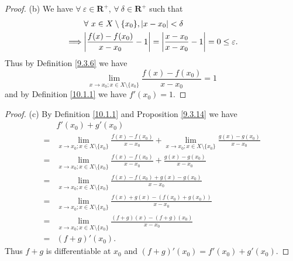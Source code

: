 \begin{proof}{(b)}
    We have \(\forall\ \varepsilon \in \mathbf{R}^+\), \(\forall\ \delta \in \mathbf{R}^+\) such that
    \begin{align*}
                 & \forall\ x \in X \setminus \{x_0\}, \abs*{x - x_0} < \delta                                         \\
        \implies & \abs*{\frac{f(x) - f(x_0)}{x - x_0} - 1} = \abs*{\frac{x - x_0}{x - x_0} - 1} = 0 \leq \varepsilon.
    \end{align*}
    Thus by Definition \ref{9.3.6} we have
    \[
        \lim_{x \to x_0 ; x \in X \setminus \{x_0\}} \frac{f(x) - f(x_0)}{x - x_0} = 1
    \]
    and by Definition \ref{10.1.1} we have \(f'(x_0) = 1\).
\end{proof}

\begin{proof}{(c)}
    By Definition \ref{10.1.1} and Proposition \ref{9.3.14} we have
    \begin{align*}
          & f'(x_0) + g'(x_0)                                                                                                                                       \\
        = & \lim_{x \to x_0 ; x \in X \setminus \{x_0\}} \frac{f(x) - f(x_0)}{x - x_0} + \lim_{x \to x_0 ; x \in X \setminus \{x_0\}} \frac{g(x) - g(x_0)}{x - x_0} \\
        = & \lim_{x \to x_0 ; x \in X \setminus \{x_0\}} \frac{f(x) - f(x_0)}{x - x_0} + \frac{g(x) - g(x_0)}{x - x_0}                                              \\
        = & \lim_{x \to x_0 ; x \in X \setminus \{x_0\}} \frac{f(x) - f(x_0) + g(x) - g(x_0)}{x - x_0}                                                              \\
        = & \lim_{x \to x_0 ; x \in X \setminus \{x_0\}} \frac{f(x) + g(x) - (f(x_0) + g(x_0))}{x - x_0}                                                            \\
        = & \lim_{x \to x_0 ; x \in X \setminus \{x_0\}} \frac{(f + g)(x) - (f + g)(x_0)}{x - x_0}                                                                  \\
        = & (f + g)'(x_0).
    \end{align*}
    Thus \(f + g\) is differentiable at \(x_0\) and \((f + g)'(x_0) = f'(x_0) + g'(x_0)\).
\end{proof}

